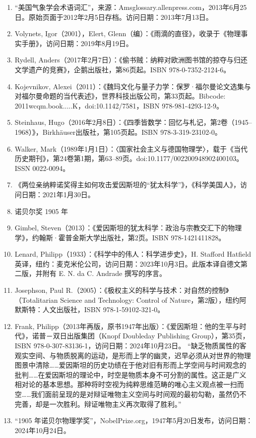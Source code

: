 \begin{enumerate}
\item “美国气象学会术语词汇”，来源：Amsglossary.allenpress.com，2013年6月25日。原始页面于2012年2月5日存档。访问日期：2013年7月13日。
\item Volynets, Igor（2001），Elert, Glenn（编）：《雨滴的直径》，收录于《物理事实手册》，访问日期：2019年8月19日。
\item Rydell, Anders（2017年2月7日）：《偷书贼：纳粹对欧洲图书馆的掠夺与归还文学遗产的竞赛》，企鹅出版社，第86页起。ISBN 978-0-7352-2124-6。
\item Kojevnikov, Alexei（2011）：《魏玛文化与量子力学：保罗·福尔曼论文选集与对福尔曼命题的当代表述》，世界科技出版公司，第33页起。Bibcode: 2011wcqm.book.....K，doi:10.1142/7581，ISBN 978-981-4293-12-9。
\item Steinhaus, Hugo（2016年2月8日）：《四季皆数学：回忆与札记，第2卷（1945–1968）》，Birkhäuser出版社，第105页起。ISBN 978-3-319-23102-0。
\item Walker, Mark（1989年1月1日）：〈国家社会主义与德国物理学〉，载于《当代历史期刊》，第24卷第1期，第63–89页。doi:10.1177/002200948902400103。ISSN 0022-0094。
\item 《两位亲纳粹诺奖得主如何攻击爱因斯坦的“犹太科学”》，《科学美国人》，访问日期：2021年1月30日。
\item 诺贝尔奖 1905 年
\item Gimbel, Steven（2013）：《爱因斯坦的犹太科学：政治与宗教交汇下的物理学》，约翰斯·霍普金斯大学出版社，第2页。ISBN 978-1421411828。
\item Lenard, Philipp（1933）：《科学中的伟人：科学进步史》，H. Stafford Hatfield 英译，纽约：麦克米伦公司，访问日期：2023年10月3日。此版本译自德文第二版，并附有 E. N. da C. Andrade 撰写的序言。
\item Josephson, Paul R.（2005）：《极权主义的科学与技术：对自然的控制》（Totalitarian Science and Technology: Control of Nature，第2版），纽约阿默斯特：人文出版社，ISBN 978-1-59102-321-0。
\item Frank, Philipp（2013年再版，原书1947年出版）：《爱因斯坦：他的生平与时代》，诺普－双日出版集团（Knopf Doubleday Publishing Group），第35页，ISBN 978-0-307-83136-1，访问日期：2024年10月23日。
 “缺乏物质属性的客观实空间、与物质脱离的运动，是形而上学的幽灵，迟早必须从对世界的物理图景中清除……爱因斯坦的历史功绩在于他对旧有形而上学空间与时间观念的批判……在爱因斯坦的理论中，时空是物质本身不可分割的属性。这正是广义相对论的基本思想。那种将时空视为纯粹思维范畴的唯心主义观点被一扫而空……我们面前呈现的是对辩证唯物主义空间与时间观的最初勾勒，虽然仍不完善，却是一次胜利。辩证唯物主义再次取得了胜利。”
\item “1905 年诺贝尔物理学奖”，NobelPrize.org，1947年5月20日发布，访问日期：2024年10月24日。


\end{enumerate}
